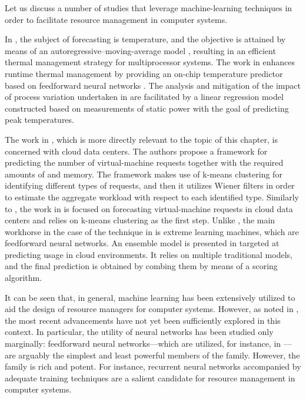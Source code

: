 Let us discuss a number of studies that leverage machine-learning techniques in
order to facilitate resource management in computer systems.

In \cite{coskun2008}, the subject of forecasting is temperature, and the
objective is attained by means of an autoregressive--moving-average model
\cite{hastie2013}, resulting in an efficient thermal management strategy for
multiprocessor systems. The work in \cite{kumar2010} enhances runtime thermal
management by providing an on-chip temperature predictor based on feedforward
neural networks \cite{hastie2013}. The analysis and mitigation of the impact of
process variation undertaken in \cite{juan2014} are facilitated by a linear
regression model \cite{hastie2013} constructed based on measurements of static
power with the goal of predicting peak temperatures.

The work in \cite{dabbagh2015}, which is more directly relevant to the topic of
this chapter, is concerned with cloud data centers. The authors propose a
framework for predicting the number of virtual-machine requests together with
the required amounts of  and memory. The framework makes use of k-means
clustering \cite{hastie2013} for identifying different types of requests, and
then it utilizes Wiener filters in order to estimate the aggregate workload with
respect to each identified type. Similarly to \cite{dabbagh2015}, the work in
\cite{ismaeel2015} is focused on forecasting virtual-machine requests in cloud
data centers and relies on k-means clustering as the first step. Unlike
\cite{dabbagh2015}, the main workhorse in the case of the technique in
\cite{ismaeel2015} is extreme learning machines, which are feedforward neural
networks. An ensemble model \cite{hastie2013} is presented in \cite{cao2014}
targeted at predicting  usage in cloud environments. It relies on
multiple traditional models, and the final prediction is obtained by combing
them by means of a scoring algorithm.

It can be seen that, in general, machine learning has been extensively utilized
to aid the design of resource managers for computer systems. However, as noted
in , the most recent advancements have not yet been
sufficiently explored in this context. In particular, the utility of neural
networks has been studied only marginally: feedforward neural networks---which
are utilized, for instance, in \cite{kumar2010, ismaeel2015}---are arguably the
simplest and least powerful members of the family. However, the family is rich
and potent. For instance, recurrent neural networks accompanied by adequate
training techniques \cite{goodfellow2016} are a salient candidate for resource
management in computer systems.

